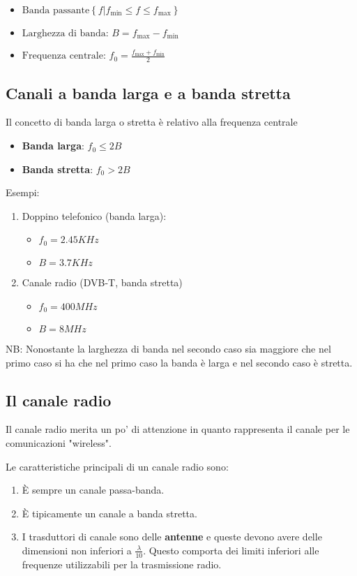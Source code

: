 \begin{itemize}
    \item $\text{Banda passante} \left\{ f \vert f_{\text{min}} \leq f \leq f_{\text{max}} \right\}$
    \item $\text{Larghezza di banda: } B = f_{\text{max}} - f_{\text{min}} $
    \item $\text{Frequenza centrale: } f_0 = \frac{f_{\text{max}} + f_{\text{min}}}{2}$
\end{itemize}



\subsection*{Canali a banda larga e a banda stretta}
Il concetto di banda larga o stretta è relativo alla frequenza centrale
\begin{itemize}
    \item \textbf{Banda larga}: $f_0 \leq 2B$
    \item \textbf{Banda stretta}: $f_0 > 2B$
\end{itemize}


Esempi:
\begin{enumerate}
  \item Doppino telefonico (banda larga): 
\begin{itemize}
    \item $f_0 = 2.45 KHz$
    \item $B = 3.7 KHz$
\end{itemize}
    \item Canale radio (DVB-T, banda stretta) 
    \begin{itemize}
        \item $f_0 = 400 MHz$ 
        \item $B = 8 MHz$
    \end{itemize}
\end{enumerate}

NB: Nonostante la larghezza di banda nel secondo caso sia maggiore che nel primo caso si ha che nel primo caso la banda è larga e nel secondo caso è stretta.

\subsection*{Il canale radio}
Il canale radio merita un po' di attenzione in quanto rappresenta il canale per le comunicazioni "wireless".



Le caratteristiche principali di un canale radio sono:
\begin{enumerate}
    \item È sempre un canale passa-banda.
    \item È tipicamente un canale a banda stretta.
    \item I trasduttori di canale sono delle \textbf{antenne} e queste devono avere delle dimensioni non inferiori a $\frac{\lambda}{10}$. Questo comporta dei limiti inferiori alle frequenze utilizzabili per la trasmissione radio.
\end{enumerate}

